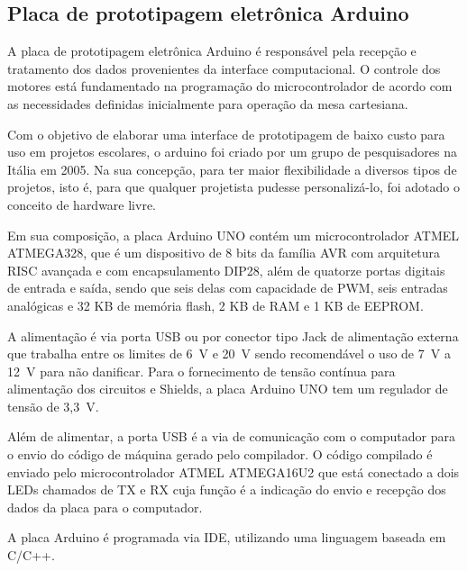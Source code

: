 \subsection{Placa de prototipagem eletrônica Arduino}\label{subsec:metarduino}

A placa de prototipagem eletrônica Arduino é responsável pela recepção e tratamento dos dados provenientes 
da interface computacional. O controle dos motores está fundamentado na programação do microcontrolador 
de acordo com as necessidades definidas inicialmente para operação da mesa cartesiana.

Com o objetivo de elaborar uma interface de prototipagem de baixo custo para uso em projetos escolares, 
o arduino foi criado por um grupo de pesquisadores na Itália em 2005. Na sua concepção, para ter maior 
flexibilidade a diversos tipos de projetos, isto é, para que qualquer projetista pudesse personalizá-lo, 
foi adotado o conceito de hardware livre.

Em sua composição, a placa Arduino UNO contém um microcontrolador ATMEL ATMEGA328, que é um dispositivo 
de 8 bits da família AVR com arquitetura \ac{RISC} avançada e com encapsulamento DIP28, além de quatorze portas 
digitais de entrada e saída, sendo que seis delas com capacidade de \ac{PWM}, seis 
entradas analógicas e 32 KB de memória flash, 2 KB de \ac{RAM} e 1 KB de \ac{EEPROM}. 

A alimentação é via porta \ac{USB} ou por conector tipo Jack de alimentação externa que trabalha entre os 
limites de 6~V e 20~V sendo recomendável o uso de 7~V a 12~V para não danificar. Para o fornecimento 
de tensão contínua para alimentação dos circuitos e Shields, a placa Arduino UNO tem um regulador 
de tensão de 3,3~V.

Além de alimentar, a porta \ac{USB} é a via de comunicação com o computador para o envio do código de máquina 
gerado pelo compilador. O código compilado é enviado pelo microcontrolador ATMEL ATMEGA16U2 que está 
conectado a dois LEDs chamados de TX e RX cuja função é a indicação do envio e recepção dos dados da 
placa para o computador.

A placa Arduino é programada via \ac{IDE}, utilizando uma linguagem baseada em C/C++.

